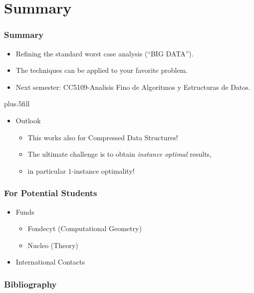 \section*{Summary}
\begin{frame}
  \frametitle<presentation>{Summary}

  \begin{itemize}
  \item Refining the standard worst case analysis (``\alert{BIG DATA''}).  
  \item The techniques can be applied to your favorite problem.
  \item Next semester: \alert{CC5109-Analisis Fino de Algoritmos y Estructuras de Datos}.
  \end{itemize}
  
  \vskip0pt plus.5fill
  \begin{itemize}
  \item
    Outlook
    \begin{itemize}
    \item This works also for Compressed Data Structures!
    \item The ultimate challenge is to obtain \emph{instance optimal} results, 
    \item in particular  \alert{$1$-instance optimality}!
    \end{itemize}
  \end{itemize}
\end{frame}

\begin{frame}
\frametitle{For Potential Students}
\begin{itemize}
\item Funds
  \begin{itemize}
\item Fondecyt (Computational Geometry)
\item Nucleo (Theory)
  \end{itemize}
\item International Contacts
\end{itemize}
\end{frame}


\begin{frame}
  \frametitle<presentation>{Bibliography}
\nocite{2013-IanFest-FromTimeToSpace-Barbay}
\nocite{2009-FOCS-InstanceOptimalGeometricAlgorithms-AfshaniBarbayChan}
\nocite{2013-CCCG-MaximumWeightPlanarBoxesInON2TimeAndBetter-BarbayChanNavarroPerezLantero}

\tiny





\end{frame}


